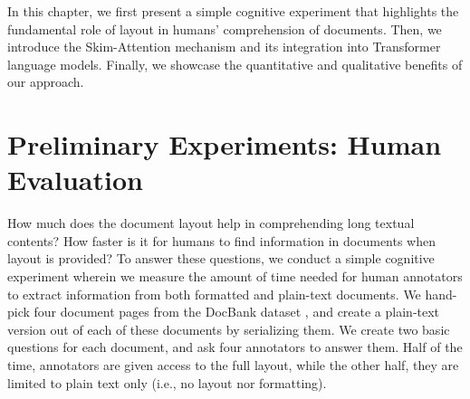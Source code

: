 In this chapter, we first present a simple cognitive experiment that highlights the fundamental role of layout in humans' comprehension of documents. Then, we introduce the Skim-Attention mechanism and its integration into Transformer language models. Finally, we showcase the quantitative and qualitative benefits of our approach.


\section{Preliminary Experiments: Human Evaluation}
\label{section:human-evaluation}

How much does the document layout help in comprehending long textual contents? How faster is it for humans to find information in documents when layout is provided? To answer these questions, we conduct a simple cognitive experiment wherein we measure the amount of time needed for human annotators to extract information from both formatted and plain-text documents. We hand-pick four document pages from the DocBank dataset \citep{li2020docbank}, and create a plain-text version out of each of these documents by serializing them. We create two basic questions for each document, and ask four annotators to answer them. Half of the time, annotators are given access to the full layout, while the other half, they are limited to plain text only (i.e., no layout nor formatting).

